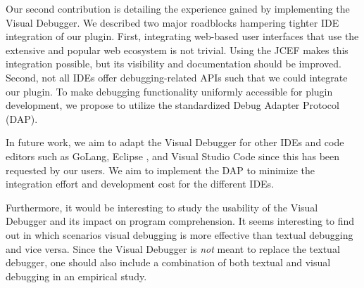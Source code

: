 \documentclass[sigconf]{acmart}
\begin{document}
Our second contribution is detailing the experience gained by implementing the Visual Debugger.
We described two major roadblocks hampering tighter IDE integration of our plugin.
First, integrating web-based user interfaces that use the extensive and popular web ecosystem is not trivial.
Using the JCEF makes this integration possible, but its visibility and documentation should be improved.
Second, not all IDEs offer debugging-related APIs such that we could integrate our plugin.
To make debugging functionality uniformly accessible for plugin development, we propose to utilize the standardized Debug Adapter Protocol (DAP).

In future work, we aim to adapt the Visual Debugger for other IDEs and code editors such as GoLang, Eclipse \cite{desrivieresEclipsePlatformIntegrating2004}, and Visual Studio Code since this has been requested by our users.
We aim to implement the DAP to minimize the integration effort and development cost for the different IDEs.

Furthermore, it would be interesting to study the usability of the Visual Debugger and its impact on program comprehension.
It seems interesting to find out in which scenarios visual debugging is more effective than textual debugging and vice versa.
Since the Visual Debugger is \textit{not} meant to replace the textual debugger, one should also include a combination of both textual and visual debugging in an empirical study.


\renewcommand\UrlFont{\color{black}}



\end{document}
